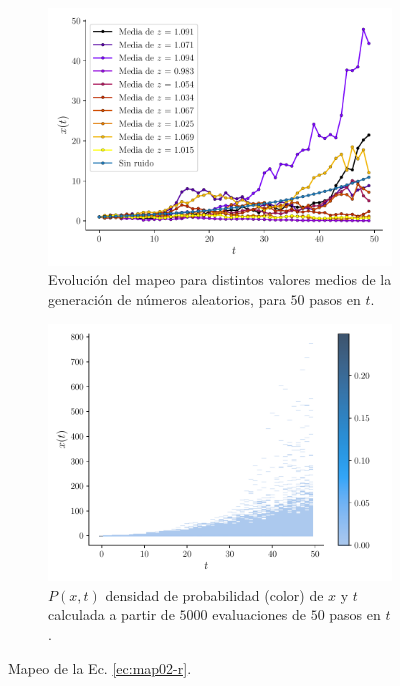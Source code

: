 \documentclass[twocolumn,aps,prl]{revtex4-1}
\newcommand{\nSimulacionesB}{5000}
\newcommand{\Nsteps}{50}
\begin{document}
\begin{figure}[ht!]
  \centering
  \begin{subfigure}[b]{0.49\linewidth}
    \centering
    \includegraphics[width = 0.999\textwidth]{figuras/ex02-mapeo-02.pdf}
    \caption{Evolución del mapeo para distintos valores medios de la generación de números aleatorios, para $\Nsteps$ pasos en $t$.}
    \label{fig:figuras/ex02-mapeo-02}
  \end{subfigure}
  \begin{subfigure}[b]{0.49\linewidth}
    \centering
    \includegraphics[width = 0.999\textwidth]{figuras/ex02-histograma-02.pdf}
    \caption{$P(x,t)$ densidad de probabilidad (color) de $x$ y $t$ calculada a partir de $\nSimulacionesB$ evaluaciones de $\Nsteps$ pasos en $t$.}
    \label{fig:figuras/ex02-histograma-02}
  \end{subfigure}  
  \caption{Mapeo de la Ec. \ref{ec:map02-r}.}
  \label{fig:figuras/ex02-02}
\end{figure}
\end{document}
